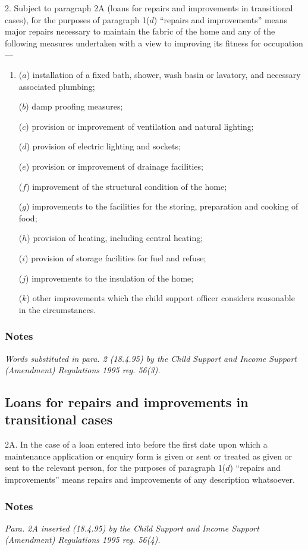 \documentclass[a4paper]{article}
\newcommand\amendment[1]{\subsubsection*{Notes}{\itshape\frenchspacing\footnotesize #1 \par\goodbreak}}
\begin{document}
2.  %
Subject to paragraph 2A (loans for repairs and improvements in transitional cases), for the purposes of  %
paragraph 1($d$) “repairs and improvements” means major repairs necessary to maintain the fabric of the home and any of the following measures undertaken with a view to improving its fitness for occupation—
\begin{enumerate}\item[]
($a$) installation of a fixed bath, shower, wash basin or lavatory, and necessary associated plumbing;

($b$) damp proofing measures;

($c$) provision or improvement of ventilation and natural lighting;

($d$) provision of electric lighting and sockets;

($e$) provision or improvement of drainage facilities;

($f$) improvement of the structural condition of the home;

($g$) improvements to the facilities for the storing, preparation and cooking of food;

($h$) provision of heating, including central heating;

($i$) provision of storage facilities for fuel and refuse;

($j$) improvements to the insulation of the home;

($k$) other improvements which the child support officer considers reasonable in the circumstances.
\end{enumerate}

\amendment{
Words substituted in para. 2 (18.4.95) by the Child Support and Income Support (Amendment) Regulations 1995 reg. 56(3).
}

\subsection*{Loans for repairs and improvements in transitional cases}

2A.  In the case of a loan entered into before the first date upon which a maintenance application or enquiry form is given or sent or treated as given or sent to the relevant person, for the purposes of paragraph 1($d$) “repairs and improvements” means repairs and improvements of any description whatsoever.

\amendment{
Para. 2A inserted (18.4.95) by the Child Support and Income Support (Amendment) Regulations 1995 reg. 56(4).
}
\end{document}
